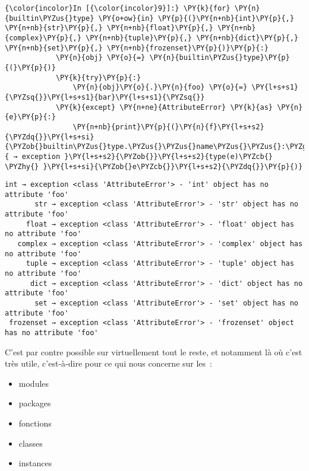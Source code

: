     \begin{Verbatim}[commandchars=\\\{\}]
{\color{incolor}In [{\color{incolor}9}]:} \PY{k}{for} \PY{n}{builtin\PYZus{}type} \PY{o+ow}{in} \PY{p}{(}\PY{n+nb}{int}\PY{p}{,} \PY{n+nb}{str}\PY{p}{,} \PY{n+nb}{float}\PY{p}{,} \PY{n+nb}{complex}\PY{p}{,} \PY{n+nb}{tuple}\PY{p}{,} \PY{n+nb}{dict}\PY{p}{,} \PY{n+nb}{set}\PY{p}{,} \PY{n+nb}{frozenset}\PY{p}{)}\PY{p}{:}
            \PY{n}{obj} \PY{o}{=} \PY{n}{builtin\PYZus{}type}\PY{p}{(}\PY{p}{)}
            \PY{k}{try}\PY{p}{:} 
                \PY{n}{obj}\PY{o}{.}\PY{n}{foo} \PY{o}{=} \PY{l+s+s1}{\PYZsq{}}\PY{l+s+s1}{bar}\PY{l+s+s1}{\PYZsq{}}
            \PY{k}{except} \PY{n+ne}{AttributeError} \PY{k}{as} \PY{n}{e}\PY{p}{:} 
                \PY{n+nb}{print}\PY{p}{(}\PY{n}{f}\PY{l+s+s2}{\PYZdq{}}\PY{l+s+si}{\PYZob{}builtin\PYZus{}type.\PYZus{}\PYZus{}name\PYZus{}\PYZus{}:\PYZgt{}10\PYZcb{}}\PY{l+s+s2}{ → exception }\PY{l+s+s2}{\PYZob{}}\PY{l+s+s2}{type(e)\PYZcb{} \PYZhy{} }\PY{l+s+si}{\PYZob{}e\PYZcb{}}\PY{l+s+s2}{\PYZdq{}}\PY{p}{)}
\end{Verbatim}


    \begin{Verbatim}[commandchars=\\\{\}]
       int → exception <class 'AttributeError'> - 'int' object has no attribute 'foo'
       str → exception <class 'AttributeError'> - 'str' object has no attribute 'foo'
     float → exception <class 'AttributeError'> - 'float' object has no attribute 'foo'
   complex → exception <class 'AttributeError'> - 'complex' object has no attribute 'foo'
     tuple → exception <class 'AttributeError'> - 'tuple' object has no attribute 'foo'
      dict → exception <class 'AttributeError'> - 'dict' object has no attribute 'foo'
       set → exception <class 'AttributeError'> - 'set' object has no attribute 'foo'
 frozenset → exception <class 'AttributeError'> - 'frozenset' object has no attribute 'foo'

    \end{Verbatim}

    C'est par contre possible sur virtuellement tout le reste, et notamment
là où c'est très utile, c'est-à-dire pour ce qui nous concerne sur les~:

\begin{itemize}
\tightlist
\item
  modules
\item
  packages
\item
  fonctions
\item
  classes
\item
  instances
\end{itemize}
